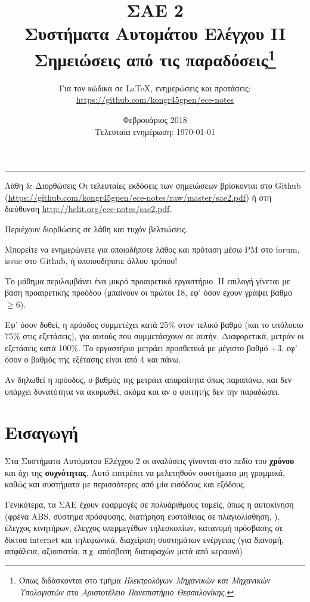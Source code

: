 \documentclass[11pt,a4paper,notitlepage,fleqn]{article}
\title{ΣΑΕ 2
	\\
	{ 
		\normalsize Συστήματα Αυτομάτου Ελέγχου II
		\\
		\normalsize Σημειώσεις από τις παραδόσεις\footnote{Όπως διδάσκονται στο τμήμα \textit{Ηλεκτρολόγων Μηχανικών και Μηχανικών Υπολογιστών} στο \textit{Αριστοτέλειο Πανεπιστήμιο Θεσσαλονίκης}.}
	}}
\date{Φεβρουάριος 2018
	\\
	{ 
		\small Τελευταία ενημέρωση: \today
	}
}
\author{
	Για τον κώδικα σε \LaTeX, ενημερώσεις και προτάσεις:
	\\
	\url{https://github.com/kongr45gpen/ece-notes}}
\begin{document}
\maketitle

\hrule
\vspace{50pt}

\begin{infobox}{Λάθη \& Διορθώσεις}
	Οι τελευταίες εκδόσεις των σημειώσεων βρίσκονται στο Github
	(\url{https://github.com/kongr45gpen/ece-notes/raw/master/sae2.pdf}) ή
	στη διεύθυνση \url{http://helit.org/ece-notes/sae2.pdf}.
	
	Περιέχουν διορθώσεις σε λάθη και τυχόν βελτιώσεις.
	
	\tcblower
	
	Μπορείτε να ενημερώνετε για οποιοδήποτε λάθος και πρόταση
	μέσω PM στο forum, issue στο Github, ή οποιουδήποτε άλλου τρόπου!
\end{infobox}
	
Το μάθημα περιλαμβάνει ένα μικρό προαιρετικό εργαστήριο. Η επιλογή γίνεται με βάση
προαιρετικής προόδου (μπαίνουν οι πρώτοι 18, εφ' όσον έχουν γράψει βαθμό \( \geq 6 \)).

Εφ' όσον δοθεί, η πρόοδος συμμετέχει κατά 25\% στον τελικό βαθμό
(και το υπόλοιπο 75\% στις εξετάσεις), για αυτούς που συμμετάσχουν
σε αυτήν. Διαφορετικά, μετράν οι εξετάσεις κατά 100\%. Το εργαστήριο μετράει προσθετικά
με μέγιστο βαθμό \( +3 \), εφ' όσον ο βαθμός της εξέτασης είναι από 4 και πάνω.

Αν δηλωθεί η πρόοδος, ο βαθμός της μετράει απαραίτητα όπως παραπάνω, και δεν υπάρχει δυνατότητα να
ακυρωθεί, ακόμα και αν ο φοιτητής δεν την παραδώσει.

\newpage

{
\hypersetup{linkcolor=black}
\listoflecture
\tableofcontents
}

\newpage
{}
\section{Εισαγωγή}
Στα Συστήματα Αυτόματου Ελέγχου 2 οι αναλύσεις γίνονται στο πεδίο του \textbf{χρόνου}
και όχι της \textbf{συχνότητας}. Αυτό επιτρέπει να μελετηθούν συστήματα μη γραμμικά,
καθώς και συστήματα με περισσότερες από μία εισόδους και εξόδους.

Γενικότερα, τα ΣΑΕ έχουν εφαρμογές σε πολυάριθμους τομείς, όπως η αυτοκίνηση (φρένα
ABS, σύστημα πρόσφυσης, διατήρηση ευστάθειας σε πλαγιολίσθηση, \textellipsis), έλεγχος
κινητήρων, έλεγχος υπερμεγέθων τηλεσκοπίων, κατανομή πρόσβασης σε δίκτυα internet και
τηλεφωνικά, διαχείριση συστημάτων ενέργειας (για διανομή, ασφάλεια, αξιοπιστία, π.χ.
απόσβεση διαταραχών μετά από κεραυνό)\textellipsis
\end{document}
